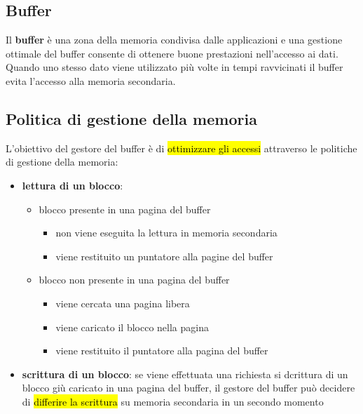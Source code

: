 \subsection{Buffer}
Il \textcolor{azzurrino}{\textbf{buffer}} è una zona della memoria condivisa dalle applicazioni e una gestione ottimale del buffer consente di ottenere buone prestazioni nell'accesso ai dati.\\[0.2ex]
Quando uno stesso dato viene utilizzato più volte in tempi ravvicinati il buffer evita
l'accesso alla memoria secondaria.


\subsection{Politica di gestione della memoria}
L'obiettivo del gestore del buffer è di \hl{ottimizzare gli accessi} attraverso le politiche di gestione della memoria:
\begin{itemize}[label=$\diamond$, itemsep=\bigskipamount]
  \item \textbf{lettura di un blocco}:
  \begin{itemize}[label=$\triangleright$, itemsep=\medskipamount]
    \item blocco presente in una pagina del buffer
    \begin{itemize}[label=$\Rightarrow$, itemsep=\smallskipamount]
      \item non viene eseguita la lettura in memoria secondaria
      \item viene restituito un puntatore alla pagine del buffer
    \end{itemize}
    \item blocco non presente in una pagina del buffer
    \begin{itemize}[label=$\Rightarrow$, itemsep=\smallskipamount]
      \item viene cercata una pagina libera
      \item viene caricato il blocco nella pagina
      \item viene restituito il puntatore alla pagina del buffer
    \end{itemize}
  \end{itemize}
  \item \textbf{scrittura di un blocco}: se viene effettuata una richiesta si dcrittura di un blocco giù caricato in una pagina del buffer, il gestore del buffer può decidere di \hl{differire la scrittura} su memoria secondaria in un secondo momento
\end{itemize}

